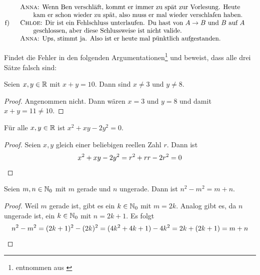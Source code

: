 \begin{aufg}
\begin{align*}
        \text{f)}\quad &\begin{tabular}{l}
            \textsc{Anna}: Wenn Ben verschläft, kommt er immer zu spät zur Vorlesung. Heute \\
            \qquad kam er schon wieder zu spät, also muss er mal wieder verschlafen haben. \\
            \textsc{Chloe}: Dir ist ein Fehlschluss unterlaufen. Du hast von $A\to B$ und $B$ auf $A$ \\
            \qquad geschlossen, aber diese Schlussweise ist nicht valide. \\
            \textsc{Anna}: Ups, stimmt ja. Also ist er heute mal pünktlich aufgestanden.
        \end{tabular}
    \end{align*}
\end{aufg}


\begin{aufg}[Fehlersuche I]
    Findet die Fehler in den folgenden Argumentationen\footnote{entnommen aus \cite{Vel06}} und beweist, dass alle drei Sätze falsch sind:
    \begin{satz}[a]
        Seien $x,y\in \mathbb R$ mit $x+y=10$. Dann sind $x\neq 3$ und $y\neq 8$.
    \end{satz}
    \begin{proof}
        Angenommen nicht. Dann wären $x=3$ und $y=8$ und damit $x+y=11\neq 10$.
    \end{proof}
    \begin{satz}[b]
        Für alle $x,y\in \mathbb R$ ist $x^2+xy-2y^2=0$.
    \end{satz}
    \begin{proof}
        Seien $x,y$ gleich einer beliebigen reellen Zahl $r$. Dann ist
        \[ x^2+xy-2y^2 = r^2+rr - 2r^2=0 \qedhere \]
    \end{proof}
    \begin{satz}[c]
        Seien $m,n\in \mathbb N_0$ mit $m$ gerade und $n$ ungerade. Dann ist $n^2-m^2=m+n$.
    \end{satz}
    \begin{proof}
        Weil $m$ gerade ist, gibt es ein $k\in \mathbb N_0$ mit $m=2k$. Analog gibt es, da $n$ ungerade ist, ein $k\in \mathbb N_0$ mit $n=2k+1$. Es folgt
            \[ n^2-m^2 = (2k+1)^2-(2k)^2 = (4k^2+4k+1)-4k^2 = 2k+(2k+1) = m+n \qedhere \]
    \end{proof}
\end{aufg}


